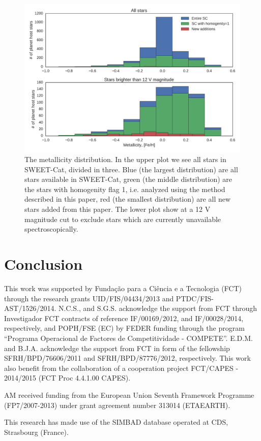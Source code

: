 \documentclass{aa}
\begin{document}
\begin{figure}[tpb]
    \centering
    \includegraphics[width=1.0\linewidth]{figures/metallicityDistribution.pdf}
    \caption{The metallicity distribution. In the upper plot we see all stars
             in SWEET-Cat, divided in three. Blue (the largest distribution)
             are all stars available in SWEET-Cat, green (the middle distribution)
             are the stars with homogenity flag 1, i.e. analyzed using the method
             described in this paper, red (the smallest distribution) are all
             new stars added from this paper. The lower plot show at a 12 V
             magnitude cut to exclude stars which are currently unavailable
             spectroscopically.}
    \label{fig:distribution}
\end{figure}








\section{Conclusion}
\label{sec:conclusion}




\begin{acknowledgements}

This work was supported by Funda\c{c}\~ao para a Ci\^encia e a Tecnologia (FCT)
through the research grants UID/FIS/04434/2013 and PTDC/FIS-AST/1526/2014.
N.C.S., and S.G.S. acknowledge the support from FCT through Investigador FCT
contracts of reference IF/00169/2012, and IF/00028/2014, respectively, and
POPH/FSE (EC) by FEDER funding through the program “Programa Operacional de
Factores de Competitividade - COMPETE”. E.D.M. and B.J.A. acknowledge the
support from FCT in form of the fellowship SFRH/BPD/76606/2011 and
SFRH/BPD/87776/2012, respectively. This work also benefit from the collaboration
of a cooperation project FCT/CAPES - 2014/2015 (FCT Proc 4.4.1.00 CAPES).

AM received funding from the European Union Seventh Framework Programme
(FP7/2007-2013) under grant agreement number 313014 (ETAEARTH).

This research has made use of the SIMBAD database operated at CDS, Strasbourg
(France).

\end{acknowledgements}




\end{document}
